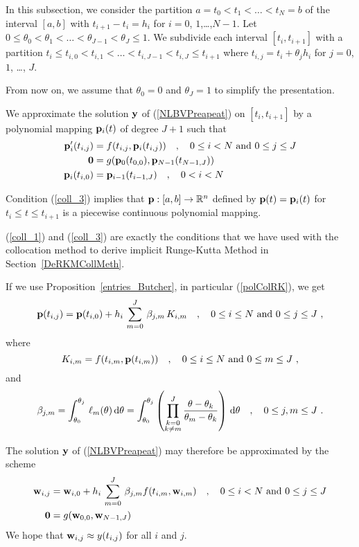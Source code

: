 In this subsection, we consider the partition
$a = t_0 < t_1 < \ldots < t_N = b$ of the interval $[a,b]$ with
$t_{i+1}-t_i = h_i$ for $i=0$, $1$,\ldots,$N-1$.  Let
$0 \leq \theta_0 < \theta_1 < \ldots < \theta_{J-1} < \theta_J
\leq 1$.  We subdivide each interval
$[t_i,t_{i+1}]$ with a partition
$t_i \leq t_{i,0} < t_{i,1} < \ldots < t_{i,J-1} < t_{i,J} \leq t_{i+1}$
where $t_{i,j} = t_i + \theta_jh_i$ for $j=0$, $1$, \ldots, $J$.

From now on, we assume that $\theta_0=0$ and $\theta_J=1$ to
simplify the presentation.

We approximate the solution $\mathbf{y}$ of (\ref{NLBVPreapeat}) on
$[t_i,t_{i+1}]$ by a polynomial mapping $\mathbf{p}_i(t)$ of degree
$J+1$ such that
\begin{align}
\mathbf{p}_i'(t_{i,j}) &= f(t_{i,j},\mathbf{p}_i(t_{i,j})) \quad ,
\quad 0 \leq i < N \ \text{and}\ 0 \leq j \leq J \label{coll_1} \\
\mathbf{0} &= g(\mathbf{p}_0(t_{0,0}),\mathbf{p}_{N-1}(t_{N-1,J})) \label{coll_2} \\
\mathbf{p}_i(t_{i,0}) &= \mathbf{p}_{i-1}(t_{i-1,J}) \quad , \quad
0 < i < N \label{coll_3}
\end{align}

Condition (\ref{coll_3}) implies that $\mathbf{p}:[a,b]\to \mathbb{R}^n$ defined by
$\mathbf{p}(t) = \mathbf{p}_i(t)$ for $t_i \leq t \leq t_{i+1}$ is a
piecewise continuous polynomial mapping.

(\ref{coll_1}) and (\ref{coll_3}) are exactly the conditions that we
have used with the collocation method to derive implicit Runge-Kutta
Method in Section~\ref{DeRKMCollMeth}.

If we use Proposition~\ref{entries_Butcher}, in particular
(\ref{polColRK}), we get
\[
\VEC{p}(t_{i,j}) = \VEC{p}(t_{i,0}) + h_i\,\sum_{m=0}^J\, \beta_{j,m}\,K_{i,m}
\quad , \quad 0 \leq i \leq N \ \text{and} \ 0 \leq j \leq J \ ,
\]
where
\[
K_{i,m} = f(t_{i,m}, \mathbf{p}(t_{i,m})) \quad , \quad
0 \leq i \leq N \ \text{and} \ 0 \leq m \leq J \ ,  
\]
and
\[
\beta_{j,m} = \int_{\theta_0}^{\theta_j}\,\ell_m(\theta)\,\mathrm{d}\theta
= \int_{\theta_0}^{\theta_j}
\left(\prod_{\substack{k=0\\k\neq m}}^J\frac{\theta -
\theta_k}{\theta_m-\theta_k}\right) \,\mathrm{d}\theta
\quad , \quad  0\leq j,m \leq J \ .
\]

The solution $\mathbf{y}$ of (\ref{NLBVPreapeat}) may therefore be
approximated by the scheme
\begin{align}
\mathbf{w}_{i,j} &= \mathbf{w}_{i,0} + h_i \, \sum_{m=0}^J\,
\beta_{j,m}f(t_{i,m},\mathbf{w}_{i,m}) \quad , \quad
0 \leq i < N \ \text{and} \  0 \leq j \leq J
\label{FDM_RK_1} \\
\mathbf{0} &= g(\mathbf{w}_{0,0} ,\mathbf{w}_{N-1,J}) \label{FDM_RK_2}
\end{align}
We hope that $\mathbf{w}_{i,j}\approx y(t_{i,j})$ for all $i$ and
$j$.


